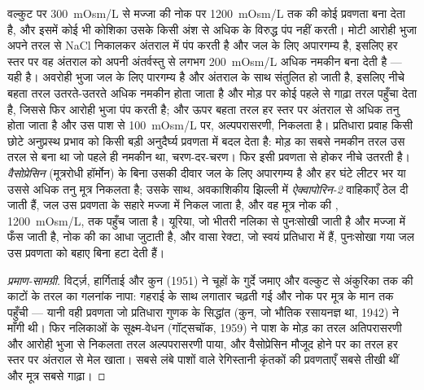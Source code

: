 \begin{proposition}[प्रतिधारा गुणक]\label{prop:b3:renal-osmoregulation:countercurrent}
 वल्कुट पर \qty{300}{mOsm/L} से मज्जा की नोक पर
\qty{1200}{mOsm/L} तक  की कोई प्रवणता बना देता है, और इसमें
कोई भी कोशिका उसके किसी अंश से अधिक के विरुद्ध पंप नहीं करती। मोटी
आरोही भुजा अपने तरल से NaCl निकालकर अंतराल में पंप करती है और जल के
लिए अपारगम्य है, इसलिए हर स्तर पर वह अंतराल को अपनी अंतर्वस्तु से लगभग
\qty{200}{mOsm/L} अधिक नमकीन बना देती है --- यही \emph{} है।
अवरोही भुजा जल के लिए पारगम्य है और अंतराल के साथ संतुलित हो जाती है,
इसलिए नीचे बहता तरल उतरते-उतरते अधिक नमकीन होता जाता है और मोड़ पर कोई
पहले से गाढ़ा तरल पहुँचा देता है, जिससे फिर आरोही भुजा पंप करती है; और
ऊपर बहता तरल हर स्तर पर अंतराल से अधिक तनु होता जाता है और उस पाश से
\qty{100}{mOsm/L} पर, अल्पपरासरणी, निकलता है। प्रतिधारा प्रवाह किसी छोटे
अनुप्रस्थ प्रभाव को किसी बड़ी अनुदैर्घ्य प्रवणता में बदल देता है: मोड़
का सबसे नमकीन तरल उस तरल से बना था जो पहले ही नमकीन था, चरण-दर-चरण।
फिर  इसी प्रवणता से होकर नीचे उतरती है।
\emph{वैसोप्रेसिन} (मूत्ररोधी हॉर्मोन) के बिना उसकी दीवार जल के लिए
अपारगम्य है और हर घंटे लीटर भर या उससे अधिक तनु मूत्र निकलता है; उसके
साथ, अवकाशिकीय झिल्ली में \emph{ऐक्वापोरिन-2} वाहिकाएँ ठेल दी जाती हैं,
जल उस प्रवणता के सहारे मज्जा में निकल जाता है, और वह मूत्र नोक की
, \qty{1200}{mOsm/L}, तक पहुँच जाता है। यूरिया, जो भीतरी
नलिका से पुनःसोखी जाती है और मज्जा में फँस जाती है, नोक की 
का आधा जुटाती है, और वासा रेक्टा, जो स्वयं प्रतिधारा में हैं, पुनःसोखा
गया जल उस प्रवणता को बहाए बिना हटा देती हैं।
\end{proposition}

\begin{proof}[प्रमाण-सामग्री]
विर्ट्ज़, हार्गिताई और कुन (1951) ने चूहों के गुर्दे जमाए और वल्कुट से
अंकुरिका तक की काटों के तरल का गलनांक नापा:  गहराई के साथ
लगातार चढ़ती गई और नोक पर मूत्र के मान तक पहुँची --- यानी वही प्रवणता
जो प्रतिधारा गुणक के सिद्धांत (कुन, जो भौतिक रसायनज्ञ था, 1942) ने
माँगी थी। फिर नलिकाओं के सूक्ष्म-वेधन (गॉट्सचॉक, 1959) ने पाश के मोड़
का तरल अतिपरासरणी और आरोही भुजा से निकलता तरल अल्पपरासरणी पाया, और
वैसोप्रेसिन मौजूद होने पर  का तरल हर स्तर पर अंतराल से मेल
खाता। सबसे लंबे पाशों वाले रेगिस्तानी कृंतकों की प्रवणताएँ सबसे तीखी
थीं और मूत्र सबसे गाढ़ा।
\end{proof}

